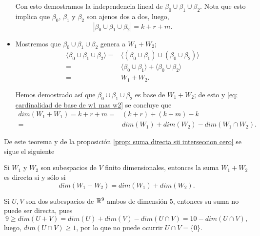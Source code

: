 \begin{itemize}
	Con esto demostramos la independencia lineal de 
	$\beta_{0} \cup \beta_{1} \cup \beta_{2}$. Nota que esto
	implica que $\beta_{0}$, $\beta_{1}$ y
	$\beta_{2}$ son ajenos dos a dos, luego,
	\begin{equation}
		\label{eq: cardinalidad de base de w1 mas w2}
		|\beta_{0} \cup \beta_{1} \cup \beta_{2}| = k + r + m.
	\end{equation}
	
	\item Mostremos que
	 $\beta_{0} \cup \beta_{1} \cup \beta_{2}$
	genera a $W_{1} + W_{2}$;
	\begin{align*}
	\langle \beta_{0} \cup \beta_{1} \cup \beta_{2} \rangle
	= & \langle
	( \beta_{0} \cup \beta_{1} ) \cup 
	( \beta_{0} \cup \beta_{2} )
	\rangle \\
	= & \langle  \beta_{0} \cup \beta_{1}  \rangle + 
	\langle  \beta_{0} \cup \beta_{2} \rangle \\
	= & W_{1} + W_{2}. 
	\end{align*}
	
	Hemos demostrado así que 
	$\beta_{0} \cup \beta_{1} \cup \beta_{2}$
	es base de $W_{1} + W_{2}$; de esto y 
	\eqref{eq: cardinalidad de base de w1 mas w2}
	se concluye que 
	\begin{align*}
	dim(W_{1} + W_{1}) = k + r + m = &
	(k+r) + (k+m) - k \\
	= & dim(W_{1}) + dim(W_{2}) - dim(W_{1} \cap W_{2}).
	\end{align*}
\end{itemize}
\QEDB
\vspace{0.2cm}

De este teorema y de la proposición 
\ref{prop: suma directa sii interseccion cero}
se sigue el siguiente

\begin{cor}
Si $W_{1}$ y $W_{2}$ son subespacios de $V$ finito dimensionales,
entonces la suma $W_{1} + W_{2}$ es directa si y sólo si 
\[
dim(W_{1} + W_{2}) = dim(W_{1}) + dim(W_{2}).
\]
\end{cor}


\begin{ejem}
Si $U, V$ son dos subespacios de $\mathbb{R}^{9}$ ambos de dimensión $5$,
entonces su suma no puede ser directa, pues
\[
9 \geq dim(U + V) = dim(U) + dim(V) - dim(U \cap V) = 10 - dim(U \cap V),
\]
luego, $dim(U \cap V) \geq 1$, por lo que no puede ocurrir
$U \cap V = \{ 0 \}$.
\end{ejem}

